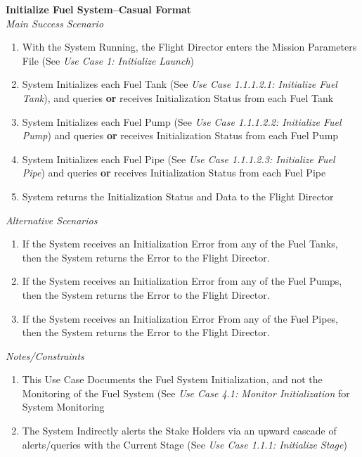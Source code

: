 \documentclass[letterpaper]{article}
\begin{document}
\noindent
\textbf{Initialize Fuel System--Casual Format}\\
\textit{Main Success Scenario}
\begin{enumerate}
   \item With the System Running, the Flight Director enters the 
      Mission Parameters File (See 
      \textit{Use Case 1:  Initialize Launch})
   \item System Initializes each Fuel Tank (See 
      \textit{Use Case 1.1.1.2.1:  Initialize Fuel Tank}), and queries
      \textbf{or} receives Initialization Status from each Fuel Tank
   \item System Initializes each Fuel Pump (See 
      \textit{Use Case 1.1.1.2.2:  Initialize Fuel Pump}) and queries
      \textbf{or} receives Initialization Status from each Fuel Pump
   \item System Initializes each Fuel Pipe (See 
      \textit{Use Case 1.1.1.2.3:  Initialize Fuel Pipe}) and queries 
      \textbf{or} receives Initialization Status from each Fuel Pipe
   \item System returns the Initialization Status and Data to the 
      Flight Director
\end{enumerate}
\textit{Alternative Scenarios}
\begin{enumerate}
   \item[2a]If the System receives an Initialization Error from any 
      of the Fuel Tanks, then the System returns the Error to the
      Flight Director.
   \item[3a]If the System receives an Initialization Error from any
      of the Fuel Pumps, then the System returns the Error to the 
      Flight Director.
   \item[4a]If the System receives an Initialization Error From any
      of the Fuel Pipes, then the System returns the Error to the 
      Flight Director.
\end{enumerate}
\textit{Notes/Constraints}
\begin{enumerate}
   \item[*a]This Use Case Documents the Fuel System Initialization,
      and not the Monitoring of the Fuel System (See 
      \textit{Use Case 4.1: Monitor Initialization} for System
      Monitoring
   \item[5a]The System Indirectly alerts the Stake Holders via an
      upward cascade of alerts/queries with the Current Stage (See
      \textit{Use Case 1.1.1: Initialize Stage})
\end{enumerate}
\end{document}
